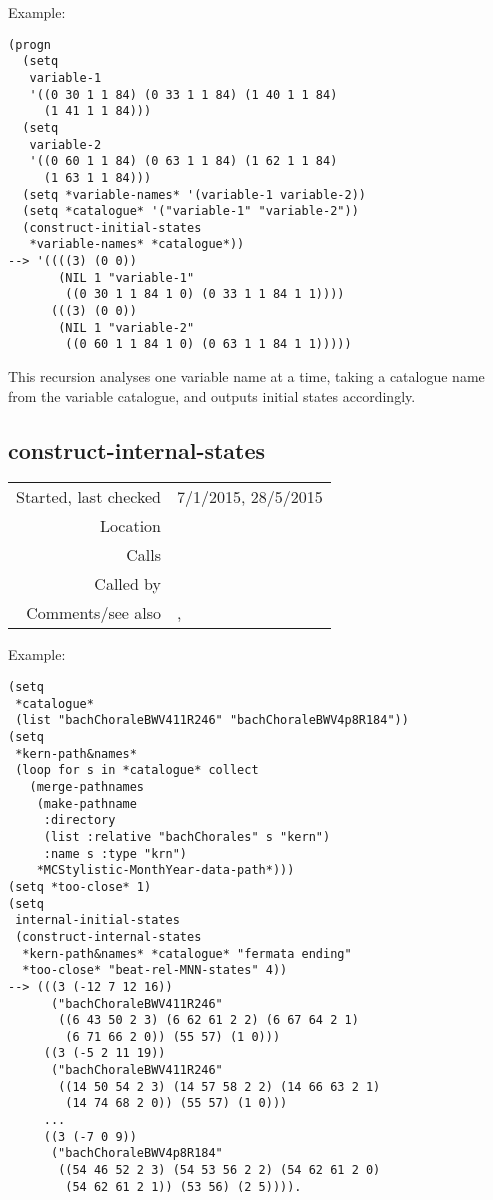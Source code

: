 \vspace{0.5cm}
\noindent Example:
\begin{verbatim}
(progn
  (setq
   variable-1
   '((0 30 1 1 84) (0 33 1 1 84) (1 40 1 1 84)
     (1 41 1 1 84)))
  (setq
   variable-2
   '((0 60 1 1 84) (0 63 1 1 84) (1 62 1 1 84)
     (1 63 1 1 84)))
  (setq *variable-names* '(variable-1 variable-2))
  (setq *catalogue* '("variable-1" "variable-2"))
  (construct-initial-states
   *variable-names* *catalogue*))
--> '((((3) (0 0))
       (NIL 1 "variable-1"
	    ((0 30 1 1 84 1 0) (0 33 1 1 84 1 1))))
      (((3) (0 0))
       (NIL 1 "variable-2"
	    ((0 60 1 1 84 1 0) (0 63 1 1 84 1 1)))))
\end{verbatim}

\noindent This recursion analyses one variable name at
a time, taking a catalogue name from the variable
catalogue, and outputs initial states accordingly.


\subsection*{construct-internal-states}\label{fun:construct-internal-states}

\vspace{0.3cm}
\begin{tabular}{r|p{8cm}}
Started, last checked & 7/1/2015, 28/5/2015 \\
Location & \nameref{sec:markov-analyse} \\
Calls & \nameref{fun:kern-file2phrase-boundary-states} \\
Called by & \\
Comments/see also & \nameref{fun:construct-initial-states}, \nameref{fun:construct-final-states}
\end{tabular}

\vspace{0.5cm}
\noindent Example:
\begin{verbatim}
(setq
 *catalogue*
 (list "bachChoraleBWV411R246" "bachChoraleBWV4p8R184"))
(setq
 *kern-path&names*
 (loop for s in *catalogue* collect
   (merge-pathnames
    (make-pathname
     :directory
     (list :relative "bachChorales" s "kern")
     :name s :type "krn")
    *MCStylistic-MonthYear-data-path*)))
(setq *too-close* 1)
(setq
 internal-initial-states
 (construct-internal-states
  *kern-path&names* *catalogue* "fermata ending"
  *too-close* "beat-rel-MNN-states" 4))
--> (((3 (-12 7 12 16))
      ("bachChoraleBWV411R246"
       ((6 43 50 2 3) (6 62 61 2 2) (6 67 64 2 1)
        (6 71 66 2 0)) (55 57) (1 0)))
     ((3 (-5 2 11 19))
      ("bachChoraleBWV411R246"
       ((14 50 54 2 3) (14 57 58 2 2) (14 66 63 2 1)
        (14 74 68 2 0)) (55 57) (1 0)))
     ...
     ((3 (-7 0 9))
      ("bachChoraleBWV4p8R184"
       ((54 46 52 2 3) (54 53 56 2 2) (54 62 61 2 0)
        (54 62 61 2 1)) (53 56) (2 5)))).
\end{verbatim}

